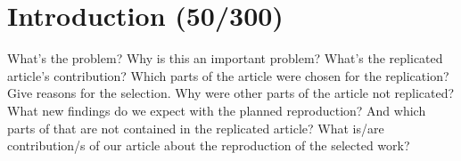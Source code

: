 \section{Introduction (50/300)}

What's the problem?
Why is this an important problem?
What's the replicated article's contribution?
Which parts of the article were chosen for the replication?
Give reasons for the selection.
Why were other parts of the article not replicated?
What new findings do we expect with the planned reproduction?
And which parts of that are not contained in the replicated article?
What is/are contribution/s of our article about the reproduction of the selected work?
